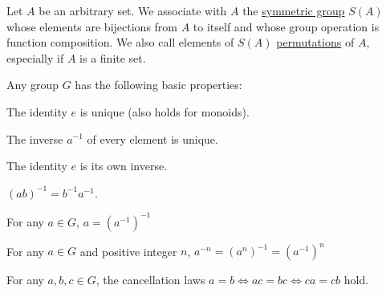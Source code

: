 \begin{definition}\label{def:symmetric_group}
  Let $A$ be an arbitrary set. We associate with $A$ the \uline{symmetric group} $S(A)$ whose elements are bijections from $A$ to itself and whose group operation is function composition. We also call elements of $S(A)$ \uline{permutations} of $A$, especially if $A$ is a finite set.
\end{definition}

\begin{proposition}\label{def:group_properties}
  Any group $G$ has the following basic properties:
  \begin{defenum}
    \item\label{def:group_properties/unique_identity} The identity $e$ is unique (also holds for monoids).
    \item\label{def:group_properties/unique_inverse} The inverse $a^{-1}$ of every element is unique.
    \item\label{def:group_properties/identity_inverse} The identity $e$ is its own inverse.
    \item\label{def:group_properties/inverse_composition} $(ab)^{-1} = b^{-1} a^{-1}$.
    \item\label{def:group_properties/double_inverse} For any $a \in G$, $a = (a^{-1})^{-1}$
    \item\label{def:group_properties/negative_power} For any $a \in G$ and positive integer $n$, $a^{-n} = (a^n)^{-1} = (a^{-1})^n$
    \item\label{def:group_properties/cancellation} For any $a, b, c \in G$, the cancellation laws $a = b \iff ac = bc \iff ca = cb$ hold.
  \end{defenum}
\end{proposition}
